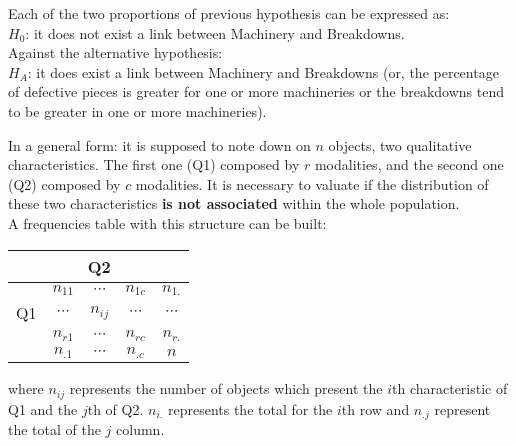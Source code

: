 \begin{frame}
  \vspace*{.25cm}
  Each of the two proportions of previous hypothesis can be expressed as:\\
  $ H_0 $: it does not exist a link between Machinery and Breakdowns.\\
  \vspace*{1cm}
  Against the alternative hypothesis:\\
  $ H_A $: it does exist a link between Machinery and Breakdowns (or, the percentage of defective pieces is greater for one or more machineries or the breakdowns tend to be greater in one or more machineries).
\end{frame}

\begin{frame}
  \vspace{-0.35cm}
  In a general form:  it is supposed to note down on $ n $ objects, two qualitative characteristics. The first one (Q1) composed by $ r $ modalities, and the second one (Q2) composed by $ c $ modalities. It is necessary to valuate if the distribution of these two characteristics \textbf{is not associated} within the whole population.\\
  A frequencies table with this structure can be built:\\
  \begin{table}
    \begin{tabular}{|c|c|c|c|c|}
      \hline
      \multicolumn{1}{|c|}{} & \multicolumn{3}{|c|}{Q2} & \multicolumn{1}{|c|}{}\\ \hline
      & $n_{11}$ & $\cdots$ & $n_{1c}$ & $n_{1.}$ \\ \cline{2-5}
      Q1  & $\cdots$ & $n_{ij}$ & $\cdots$ & $\cdots$ \\ \cline{2-5} 
      & $n_{r1}$ & $\cdots$ & $n_{rc}$ & $n_{r.}$ \\ \hline
      & $n_{.1}$ & $\cdots$ & $n_{.c}$ & $n$ \\ \hline
    \end{tabular}
  \end{table} 
  where $ n_{ij} $ represents the number of objects which present the $ i $th characteristic of Q1 and the $ j $th of Q2. $ n_{i.} $ represents the total for the $ i $th row and $ n_{.j} $ represent the total of the $ j $ column.
\end{frame}

